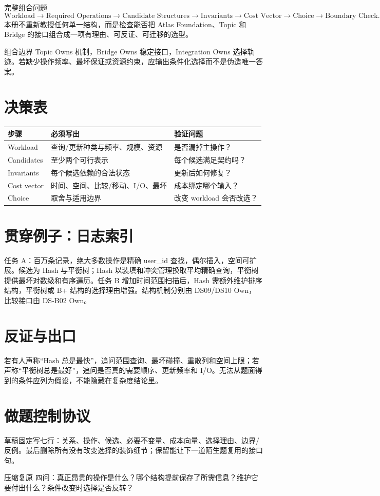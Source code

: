 \documentclass[UTF8,fontset=none,11pt,a4paper]{ctexart}
\begin{document}

\begin{corebox}{完整组合问题}
\[
\text{Workload}\to\text{Required Operations}\to\text{Candidate Structures}\to\text{Invariants}\to\text{Cost Vector}\to\text{Choice}\to\text{Boundary Check}.
\]
本册不重新教授任何单一结构，而是检查能否把 Atlas Foundation、Topic 和 Bridge 的接口组合成一项有理由、可反证、可迁移的选型。
\end{corebox}
\begin{methodbox}{组合边界}
Topic Owns 机制，Bridge Owns 稳定接口，Integration Owns 选择轨迹。若缺少操作频率、最坏保证或资源约束，应输出条件化选择而不是伪造唯一答案。
\end{methodbox}
\tableofcontents\newpage

\section{决策表}
\begin{center}\small
\begin{tabularx}{\linewidth}{L{2.4cm}YY}\toprule
步骤 & 必须写出 & 验证问题\\\midrule
Workload & 查询/更新种类与频率、规模、资源 & 是否漏掉主操作？\\
Candidates & 至少两个可行表示 & 每个候选满足契约吗？\\
Invariants & 每个候选依赖的合法状态 & 更新后如何修复？\\
Cost vector & 时间、空间、比较/移动、I/O、最坏 & 成本绑定哪个输入？\\
Choice & 取舍与适用边界 & 改变 workload 会否改选？\\\bottomrule\end{tabularx}\end{center}

\section{贯穿例子：日志索引}
任务 A：百万条记录，绝大多数操作是精确 user\_id 查找，偶尔插入，空间可扩展。候选为 Hash 与平衡树；Hash 以装填和冲突管理换取平均精确查询，平衡树提供最坏对数级和有序遍历。任务 B 增加时间范围扫描后，Hash 需额外维护排序结构，平衡树或 B+ 结构的选择理由增强。结构机制分别由 DS09/DS10 Own，比较接口由 DS-B02 Own。

\section{反证与出口}
若有人声称“Hash 总是最快”，追问范围查询、最坏碰撞、重散列和空间上限；若声称“平衡树总是最好”，追问是否真的需要顺序、更新频率和 I/O。无法从题面得到的条件应列为假设，不能隐藏在复杂度结论里。

\section{做题控制协议}
草稿固定写七行：关系、操作、候选、必要不变量、成本向量、选择理由、边界/反例。最后删除所有没有改变选择的装饰细节；保留能让下一道陌生题复用的接口句。
\begin{corebox}{压缩复原}
四问：真正昂贵的操作是什么？哪个结构提前保存了所需信息？维护它要付出什么？条件改变时选择是否反转？
\end{corebox}
\end{document}
